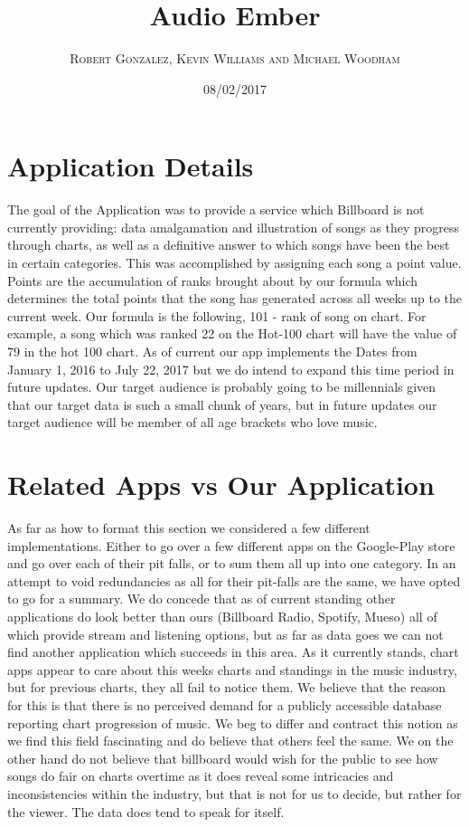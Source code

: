 \documentclass{article}
\begin{document}
\setlength\parindent{24pt}
\title{\textbf{Audio Ember}}
\author{\textsc{Robert Gonzalez, Kevin Williams and Michael Woodham}}
\date{08/02/2017}
\maketitle


\section*{Application Details}
The goal of the Application was to provide a service which Billboard is not currently providing:
data amalgamation and illustration of songs as they progress through charts, as well as a definitive answer to which songs have been the best in certain categories.
This was accomplished by assigning each song a point value.
Points are the accumulation of ranks brought about by our formula which determines the total points that the song has generated across all weeks up to the current week. 
Our formula is the following, 101 - rank of song on chart. 
For example, a song which was ranked 22 on the Hot-100 chart will have the value of 79 in the hot 100 chart.
As of current our app implements the Dates from January 1, 2016 to July 22, 2017 but we do intend to expand this time period in future updates.
Our target audience is probably going to be millennials given that our target data is such a small chunk of years, but in future updates our target audience will be member of all age brackets who love music.

\section*{Related Apps vs Our Application}
As far as how to format this section we considered a few different implementations.
Either to go over a few different apps on the Google-Play store and go over each of their pit falls, or to sum them all up into one category. 
In an attempt to void redundancies as all for their pit-falls are the same, we have opted to go for a summary. 
We do concede that as of current standing other applications do look better than ours (Billboard Radio, Spotify, Mueso) all of which provide stream and listening options,
but as far as data goes we can not find another application which succeeds in this area.
As it currently stands, chart apps appear to care about this weeks charts and standings in the music industry, but for previous charts, they all fail to notice them. 
We believe that the reason for this is that there is no perceived demand for a publicly accessible database reporting chart progression of music.
We beg to differ and contract this notion as we find this field fascinating and do believe that others feel the same.
We on the other hand do not believe that billboard would wish for the public to see how songs do fair on charts overtime as it does reveal some intricacies and inconsistencies within the industry,
but that is not for us to decide, but rather for the viewer. 
The data does tend to speak for itself.
\end{document}
